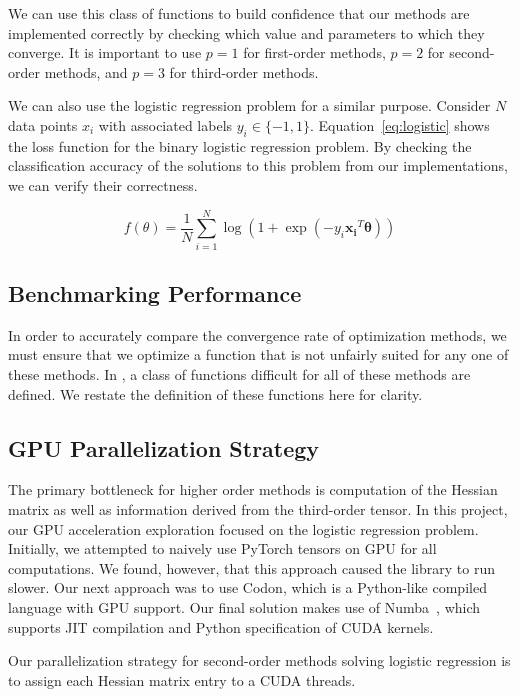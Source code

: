 \documentclass[journal]{IEEEtran}
\begin{document}
We can use this class of functions to build confidence that our methods are implemented correctly by checking which value and parameters to which they converge. It is important to use $p=1$ for first-order methods, $p=2$ for second-order methods, and $p=3$ for third-order methods.

We can also use the logistic regression problem for a similar purpose. Consider $N$ data points $x_i$ with associated labels $y_i \in \{-1, 1\}$. Equation~\ref{eq:logistic} shows the loss function for the binary logistic regression problem. By checking the classification accuracy of the solutions to this problem from our implementations, we can verify their correctness.

\begin{equation}
    f(\theta) = \frac{1}{N} \sum_{i=1}^N \log(1 + \exp(-y_i \mathbf{x_i}^T \mathbf{\theta}))
    \label{eq:logistic}
\end{equation}

\subsection{Benchmarking Performance}

In order to accurately compare the convergence rate of optimization methods, we must ensure that we optimize a function that is not unfairly suited for any one of these methods. In \cite{Nesterov2019}, a class of functions difficult for all of these methods are defined. We restate the definition of these functions here for clarity.

\subsection{GPU Parallelization Strategy}
The primary bottleneck for higher order methods is computation of the Hessian matrix as well as information derived from the third-order tensor. In this project, our GPU acceleration exploration focused on the logistic regression problem. Initially, we attempted to naively use PyTorch tensors on GPU for all computations. We found, however, that this approach caused the library to run slower. Our next approach was to use Codon, which is a Python-like compiled language with GPU support. Our final solution makes use of Numba~\cite{numba}, which supports JIT compilation and Python specification of CUDA kernels.

Our parallelization strategy for second-order methods solving logistic regression is to assign each Hessian matrix entry to a CUDA threads. 
\end{document}
